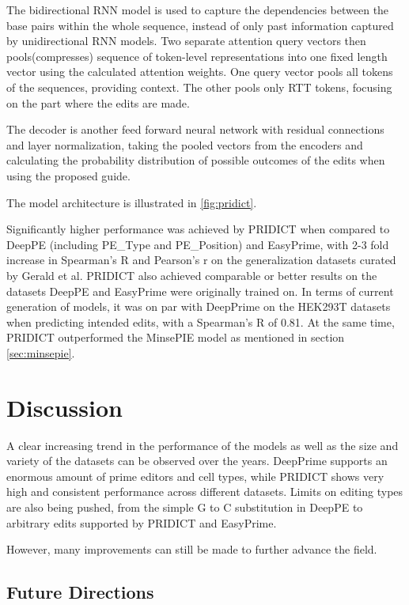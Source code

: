 \documentclass[12pt]{article}
\begin{document}
The bidirectional RNN model is used to capture the dependencies between the base pairs within the whole sequence, instead of only past information captured by unidirectional RNN models. Two separate attention query vectors then pools(compresses) sequence of token-level representations into one fixed length vector using the calculated attention weights. One query vector pools all tokens of the sequences, providing context. The other pools only RTT tokens, focusing on the part where the edits are made. 

The decoder is another feed forward neural network with residual connections and layer normalization, taking the pooled vectors from the encoders and calculating the probability distribution of possible outcomes of the edits when using the proposed guide. 

The model architecture is illustrated in \autoref{fig:pridict}.

Significantly higher performance was achieved by PRIDICT when compared to DeepPE (including PE\_Type and PE\_Position) and EasyPrime, with 2-3 fold increase in Spearman's R and Pearson's r on the generalization datasets curated by Gerald et al. PRIDICT also achieved comparable or better results on the datasets DeepPE and EasyPrime were originally trained on. In terms of current generation of models, it was on par with DeepPrime on the HEK293T datasets when predicting intended edits, with a Spearman's R of 0.81. At the same time, PRIDICT outperformed the MinsePIE model as mentioned in section \ref{sec:minsepie}.


\section{Discussion}

A clear increasing trend in the performance of the models as well as the size and variety of the datasets can be observed over the years. DeepPrime supports an enormous amount of prime editors and cell types, while PRIDICT shows very high and consistent performance across different datasets. Limits on editing types are also being pushed, from the simple G to C substitution in DeepPE to arbitrary edits supported by PRIDICT and EasyPrime.

However, many improvements can still be made to further advance the field.

\subsection{Future Directions}
\end{document}

